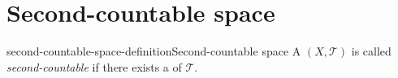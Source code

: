 \documentclass[preview]{standalone}
\begin{document}
\genpage

\section{Second-countable space}

\begin{snippetdefinition}{second-countable-space-definition}{Second-countable space}
    A \topologicalspace \((X, \mathcal{T})\) is called \textit{second-countable} if there exists a
    \countable \topologicalbasis of \(\mathcal{T}\).
\end{snippetdefinition}
\end{document}
